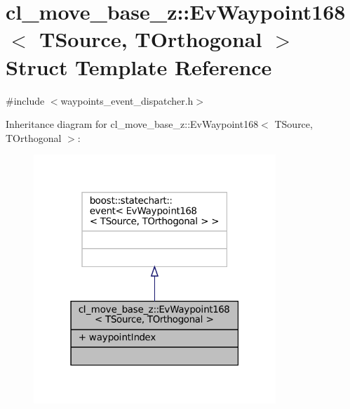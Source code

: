 \hypertarget{structcl__move__base__z_1_1EvWaypoint168}{}\section{cl\+\_\+move\+\_\+base\+\_\+z\+:\+:Ev\+Waypoint168$<$ T\+Source, T\+Orthogonal $>$ Struct Template Reference}
\label{structcl__move__base__z_1_1EvWaypoint168}


{\ttfamily \#include $<$waypoints\+\_\+event\+\_\+dispatcher.\+h$>$}



Inheritance diagram for cl\+\_\+move\+\_\+base\+\_\+z\+:\+:Ev\+Waypoint168$<$ T\+Source, T\+Orthogonal $>$\+:
\nopagebreak
\begin{figure}[H]
\begin{center}
\leavevmode
\includegraphics[width=259pt]{structcl__move__base__z_1_1EvWaypoint168__inherit__graph}
\end{center}
\end{figure}


